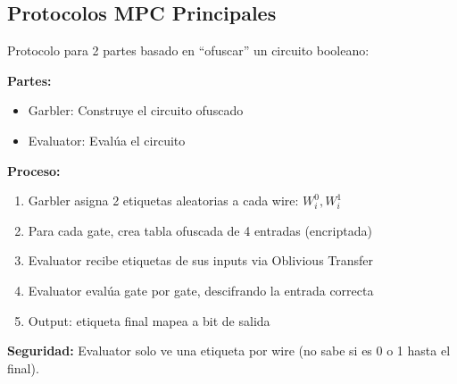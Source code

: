 \documentclass[11pt,a4paper,twoside]{book}
\theoremstyle{definition}
\theoremstyle{remark}
\begin{document}
\subsection{Protocolos MPC Principales}

\begin{mathnote}
Protocolo para 2 partes basado en ``ofuscar'' un circuito booleano:

\textbf{Partes:}
\begin{itemize}
    \item Garbler: Construye el circuito ofuscado
    \item Evaluator: Evalúa el circuito
\end{itemize}

\textbf{Proceso:}
\begin{enumerate}
    \item Garbler asigna 2 etiquetas aleatorias a cada wire: $W^0_i, W^1_i$
    \item Para cada gate, crea tabla ofuscada de 4 entradas (encriptada)
    \item Evaluator recibe etiquetas de sus inputs via Oblivious Transfer
    \item Evaluator evalúa gate por gate, descifrando la entrada correcta
    \item Output: etiqueta final mapea a bit de salida
\end{enumerate}

\textbf{Seguridad:} Evaluator solo ve una etiqueta por wire (no sabe si es 0 o 1 hasta el final).
\end{mathnote}
\end{document}
